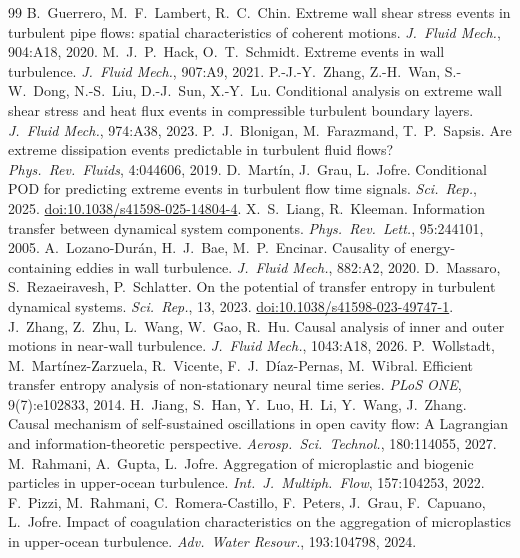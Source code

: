 \documentclass[11pt]{article}
\begin{document}
\begin{thebibliography}{99}
 B.\ Guerrero, M.\ F.\ Lambert, R.\ C.\ Chin. Extreme wall shear stress events in turbulent pipe flows: spatial characteristics of coherent motions. \emph{J.\ Fluid Mech.}, 904:A18, 2020.
 M.\ J.\ P.\ Hack, O.\ T.\ Schmidt. Extreme events in wall turbulence. \emph{J.\ Fluid Mech.}, 907:A9, 2021.
 P.-J.-Y.\ Zhang, Z.-H.\ Wan, S.-W.\ Dong, N.-S.\ Liu, D.-J.\ Sun, X.-Y.\ Lu. Conditional analysis on extreme wall shear stress and heat flux events in compressible turbulent boundary layers. \emph{J.\ Fluid Mech.}, 974:A38, 2023.
 P.\ J.\ Blonigan, M.\ Farazmand, T.\ P.\ Sapsis. Are extreme dissipation events predictable in turbulent fluid flows? \emph{Phys.\ Rev.\ Fluids}, 4:044606, 2019.
 D.\ Mart\'in, J.\ Grau, L.\ Jofre. Conditional POD for predicting extreme events in turbulent flow time signals. \emph{Sci.\ Rep.}, 2025. \href{https://doi.org/10.1038/s41598-025-14804-4}{doi:10.1038/s41598-025-14804-4}.
 X.\ S.\ Liang, R.\ Kleeman. Information transfer between dynamical system components. \emph{Phys.\ Rev.\ Lett.}, 95:244101, 2005.
 A.\ Lozano-Dur\'an, H.\ J.\ Bae, M.\ P.\ Encinar. Causality of energy-containing eddies in wall turbulence. \emph{J.\ Fluid Mech.}, 882:A2, 2020.
 D.\ Massaro, S.\ Rezaeiravesh, P.\ Schlatter. On the potential of transfer entropy in turbulent dynamical systems. \emph{Sci.\ Rep.}, 13, 2023. \href{https://doi.org/10.1038/s41598-023-49747-1}{doi:10.1038/s41598-023-49747-1}.
 J.\ Zhang, Z.\ Zhu, L.\ Wang, W.\ Gao, R.\ Hu. Causal analysis of inner and outer motions in near-wall turbulence. \emph{J.\ Fluid Mech.}, 1043:A18, 2026.
 P.\ Wollstadt, M.\ Mart\'inez-Zarzuela, R.\ Vicente, F.\ J.\ D\'iaz-Pernas, M.\ Wibral. Efficient transfer entropy analysis of non-stationary neural time series. \emph{PLoS ONE}, 9(7):e102833, 2014.
 H.\ Jiang, S.\ Han, Y.\ Luo, H.\ Li, Y.\ Wang, J.\ Zhang. Causal mechanism of self-sustained oscillations in open cavity flow: A Lagrangian and information-theoretic perspective. \emph{Aerosp.\ Sci.\ Technol.}, 180:114055, 2027.
 M.\ Rahmani, A.\ Gupta, L.\ Jofre. Aggregation of microplastic and biogenic particles in upper-ocean turbulence. \emph{Int.\ J.\ Multiph.\ Flow}, 157:104253, 2022.
 F.\ Pizzi, M.\ Rahmani, C.\ Romera-Castillo, F.\ Peters, J.\ Grau, F.\ Capuano, L.\ Jofre. Impact of coagulation characteristics on the aggregation of microplastics in upper-ocean turbulence. \emph{Adv.\ Water Resour.}, 193:104798, 2024.

\end{thebibliography}
\end{document}
